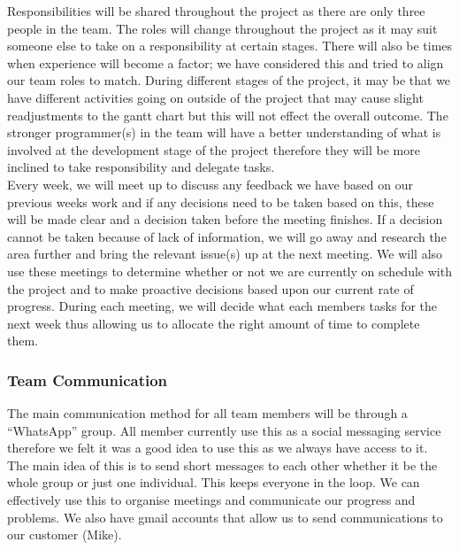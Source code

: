 Responsibilities will be shared throughout the project as there are only three people in the team.  The roles will change throughout the project as it may suit someone else to take on a responsibility at certain stages.  There will also be times when experience will become a factor; we have considered this and tried to align our team roles to match.  During different stages of the project, it may be that we have different activities going on outside of the project that may cause slight readjustments to the gantt chart but this will not effect the overall outcome.  The stronger programmer(s) in the team will have a better understanding of what is involved at the development stage of the project therefore they will be more inclined to take responsibility and delegate tasks.  \\
Every week, we will meet up to discuss any feedback we have based on our previous weeks work and if any decisions need to be taken based on this, these will be made clear and a decision taken before the meeting finishes.  If a decision cannot be taken because of lack of information, we will go away and research the area further and bring the relevant issue(s) up at the next meeting.  We will also use these meetings to determine whether or not we are currently on schedule with the project and to make proactive decisions based upon our current rate of progress.  During each meeting, we will decide what each members tasks for the next week thus allowing us to allocate the right amount of time to complete them.

\subsubsection{Team Communication}
The main communication method for all team members will be through a ``WhatsApp'' group.  All member currently use this as a social messaging service therefore we felt it was a good idea to use this as we always have access to it.  The main idea of this is to send short messages to each other whether it be the whole group or just one individual.  This keeps everyone in the loop.  We can effectively use this to organise meetings and communicate our progress and problems.  We also have gmail accounts that allow us to send communications to our customer (Mike).  \\

